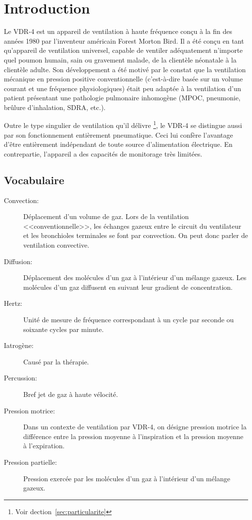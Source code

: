 \chapter{Introduction}

Le VDR-4 est un appareil de ventilation à haute fréquence conçu à la fin des années 1980 par l'inventeur américain Forest Morton Bird. 
Il a été conçu en tant qu'appareil de ventilation universel, capable de ventiler adéquatement n’importe quel poumon humain, sain ou gravement malade, de la clientèle néonatale à la clientèle adulte. 
Son développement a été motivé par le constat que la ventilation mécanique en pression positive conventionnelle (c’est-à-dire basée sur un volume courant et une fréquence physiologiques) était peu adaptée à la ventilation d'un patient présentant une pathologie pulmonaire inhomogène (MPOC, pneumonie, brûlure d’inhalation, SDRA, etc.).

Outre le type singulier de ventilation qu’il délivre \footnote{Voir dection~\ref{sec:particularite}}, le VDR-4 se distingue aussi par son fonctionnement entièrement pneumatique. Ceci lui confère l'avantage d’être entièrement indépendant de toute source d'alimentation électrique. En contrepartie, l'appareil a des capacités de monitorage très limitées.

\section{Vocabulaire}

\begin{description}
	\item[Convection:] Déplacement d'un volume de gaz. Lors de la ventilation
	<<conventionnelle>>, les échanges gazeux entre le circuit du ventilateur et
	les bronchioles terminales se font par convection. On peut donc parler de
		ventilation convective\cite{West2017}.  
	\item [Diffusion:] Déplacement des molécules d’un gaz à l’intérieur d’un mélange gazeux. Les molécules d’un gaz diffusent en suivant leur gradient de concentration.
	\item [Hertz:] Unité de mesure de fréquence correspondant à un cycle par seconde ou soixante cycles par minute.
	\item [Iatrogène:] Causé par la thérapie.
	\item [Percussion:] Bref jet de gaz à haute vélocité.
	\item [Pression motrice:] Dans un contexte de ventilation par VDR-4, on désigne pression motrice la différence entre la pression moyenne à l’inspiration et la pression moyenne à l’expiration.
	\item [Pression partielle:] Pression exercée par les molécules d’un gaz à l’intérieur d’un mélange gazeux.
\end{description}

